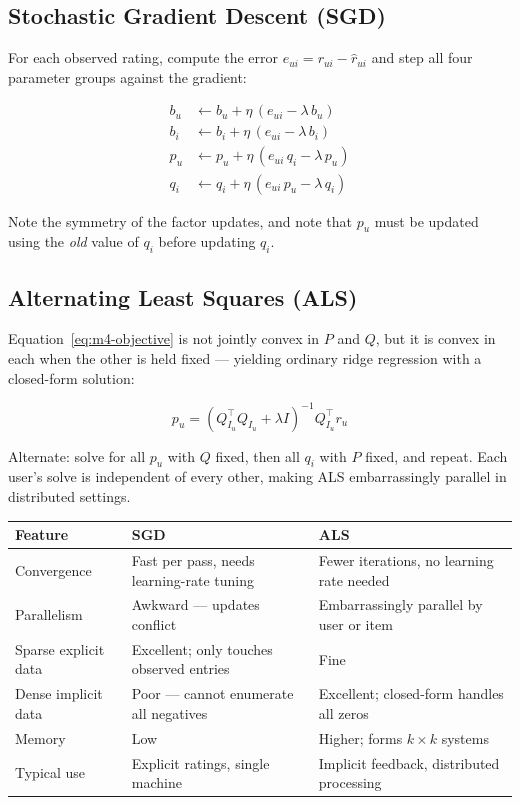 \documentclass[12pt,a4paper]{article}
\begin{document}
\subsection{Stochastic Gradient Descent (SGD)}

For each observed rating, compute the error $e_{ui} = r_{ui} - \hat{r}_{ui}$ and step all four parameter groups against the gradient:

\begin{align}
b_u &\leftarrow b_u + \eta\,(e_{ui} - \lambda\, b_u) \label{eq:m4-sgd-bu}\\
b_i &\leftarrow b_i + \eta\,(e_{ui} - \lambda\, b_i) \label{eq:m4-sgd-bi}\\
p_u &\leftarrow p_u + \eta\,(e_{ui}\, q_i - \lambda\, p_u) \label{eq:m4-sgd-pu}\\
q_i &\leftarrow q_i + \eta\,(e_{ui}\, p_u - \lambda\, q_i) \label{eq:m4-sgd-qi}
\end{align}

Note the symmetry of the factor updates, and note that $p_u$ must be updated using the \emph{old} value of $q_i$ before updating $q_i$.

\subsection{Alternating Least Squares (ALS)}

Equation~\ref{eq:m4-objective} is not jointly convex in $P$ and $Q$, but it is convex in each when the other is held fixed --- yielding ordinary ridge regression with a closed-form solution:

\begin{equation}
p_u = \left(Q_{I_u}^{\top} Q_{I_u} + \lambda I\right)^{-1} Q_{I_u}^{\top} r_u
\label{eq:m4-als}
\end{equation}

Alternate: solve for all $p_u$ with $Q$ fixed, then all $q_i$ with $P$ fixed, and repeat. Each user's solve is independent of every other, making ALS embarrassingly parallel in distributed settings.

\begin{center}
\renewcommand{\arraystretch}{1.4}
\begin{tabular}{|l|p{5.5cm}|p{6.5cm}|}
\hline
\textbf{Feature} & \textbf{SGD} & \textbf{ALS} \\
\hline
Convergence & Fast per pass, needs learning-rate tuning & Fewer iterations, no learning rate needed \\
Parallelism & Awkward --- updates conflict & Embarrassingly parallel by user or item \\
Sparse explicit data & Excellent; only touches observed entries & Fine \\
Dense implicit data & Poor --- cannot enumerate all negatives & Excellent; closed-form handles all zeros \\
Memory & Low & Higher; forms $k \times k$ systems \\
Typical use & Explicit ratings, single machine & Implicit feedback, distributed processing \\
\hline
\end{tabular}
\end{center}
\end{document}
